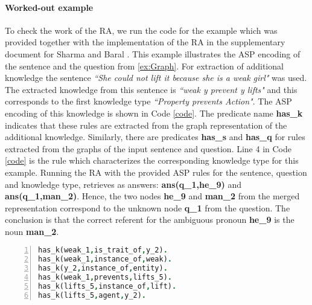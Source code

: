 \paragraph{Worked-out example} To check the work of the RA, we run the code for the example which was provided together with the implementation of the RA in the supplementary document for Sharma and Baral \cite{2018CommonsenseKT}. This example illustrates the ASP encoding of the sentence and the question from \ref{ex:Graph}.
For extraction of additional knowledge the sentence \textit{``She could not lift it because she is a weak girl"} was used. The extracted knowledge from this sentence is \textit{``weak y prevent y lifts"} and this corresponds to the first knowledge type \textit{``Property prevents Action"}. The ASP encoding of this knowledge is shown in Code \ref{code}. The predicate name \textbf{has\_k} indicates that these rules are extracted from the graph representation of the additional knowledge. Similarly, there are predicates \textbf{has\_s} and \textbf{has\_q} for rules extracted from the graphs of the input sentence and question. Line 4 in Code \ref{code} is the rule which characterizes the corresponding knowledge type for this example. Running the RA with the provided ASP rules for the sentence, question and knowledge type, retrieves as answers: \textbf{ans(q\_1,he\_9)} and \textbf{ans(q\_1,man\_2)}. Hence, the two nodes \textbf{he\_9} and \textbf{man\_2} from the merged representation correspond to the unknown node \textbf{q\_1} from the question. The conclusion is that the correct referent for the ambiguous pronoun \textbf{he\_9} is the noun \textbf{man\_2}. 

\pagebreak
\begin{lstlisting}[language = Prolog, style=SC, caption={``weak y prevents y lifts"},label=code,numbers=left,
numberstyle=\tiny ]
has_k(weak_1,is_trait_of,y_2).
has_k(weak_1,instance_of,weak).
has_k(y_2,instance_of,entity).
has_k(weak_1,prevents,lifts_5).
has_k(lifts_5,instance_of,lift).
has_k(lifts_5,agent,y_2).
\end{lstlisting}


